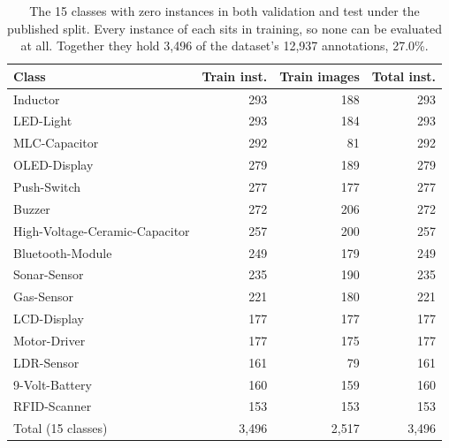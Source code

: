 \begin{table}[t]
  \centering
  \caption{The 15 classes with zero instances in both validation and test under the published split. Every instance of each sits in training, so none can be evaluated at all. Together they hold 3,496 of the dataset's 12,937 annotations, 27.0\%.}
  \label{tab:unevaluable-classes}
  \begin{tabular}{lrrr}
    \toprule
    Class & Train inst. & Train images & Total inst. \\
    \midrule
    Inductor & 293 & 188 & 293 \\
    LED-Light & 293 & 184 & 293 \\
    MLC-Capacitor & 292 & 81 & 292 \\
    OLED-Display & 279 & 189 & 279 \\
    Push-Switch & 277 & 177 & 277 \\
    Buzzer & 272 & 206 & 272 \\
    High-Voltage-Ceramic-Capacitor & 257 & 200 & 257 \\
    Bluetooth-Module & 249 & 179 & 249 \\
    Sonar-Sensor & 235 & 190 & 235 \\
    Gas-Sensor & 221 & 180 & 221 \\
    LCD-Display & 177 & 177 & 177 \\
    Motor-Driver & 177 & 175 & 177 \\
    LDR-Sensor & 161 & 79 & 161 \\
    9-Volt-Battery & 160 & 159 & 160 \\
    RFID-Scanner & 153 & 153 & 153 \\
    \midrule
    Total (15 classes) & 3,496 & 2,517 & 3,496 \\
    \bottomrule
  \end{tabular}
\end{table}
